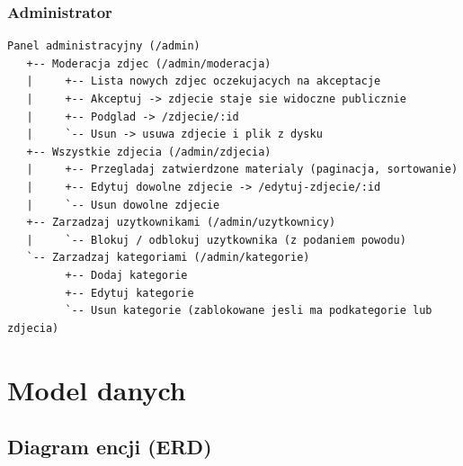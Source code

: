 \documentclass[12pt, a4paper]{article}
\begin{document}
\subsubsection{Administrator}

\begin{lstlisting}[style=plain]
Panel administracyjny (/admin)
   +-- Moderacja zdjec (/admin/moderacja)
   |     +-- Lista nowych zdjec oczekujacych na akceptacje
   |     +-- Akceptuj -> zdjecie staje sie widoczne publicznie
   |     +-- Podglad -> /zdjecie/:id
   |     `-- Usun -> usuwa zdjecie i plik z dysku
   +-- Wszystkie zdjecia (/admin/zdjecia)
   |     +-- Przegladaj zatwierdzone materialy (paginacja, sortowanie)
   |     +-- Edytuj dowolne zdjecie -> /edytuj-zdjecie/:id
   |     `-- Usun dowolne zdjecie
   +-- Zarzadzaj uzytkownikami (/admin/uzytkownicy)
   |     `-- Blokuj / odblokuj uzytkownika (z podaniem powodu)
   `-- Zarzadzaj kategoriami (/admin/kategorie)
         +-- Dodaj kategorie
         +-- Edytuj kategorie
         `-- Usun kategorie (zablokowane jesli ma podkategorie lub zdjecia)
\end{lstlisting}

\section{Model danych}

\subsection{Diagram encji (ERD)}
\end{document}
